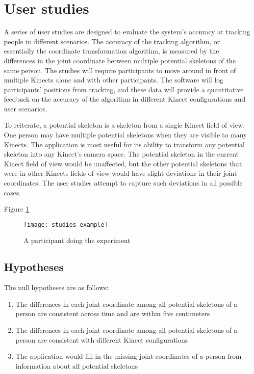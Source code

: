 \section{User studies}
\label{sec:user_studies}

A series of user studies are designed to evaluate the system's accuracy at tracking people in different scenarios. The accuracy of the tracking algorithm, or essentially the coordinate transformation algorithm, is measured by the differences in the joint coordinate between multiple potential skeletons of the same person. The studies will require participants to move around in front of multiple Kinects alone and with other participants. The software will log participants' positions from tracking, and these data will provide a quantitative feedback on the accuracy of the algorithm in different Kinect configurations and user scenarios.

To reiterate, a potential skeleton is a skeleton from a single Kinect field of view. One person may have multiple potential skeletons when they are visible to many Kinects. The application is most useful for its ability to transform any potential skeleton into any Kinect's camera space. The potential skeleton in the current Kinect field of view would be unaffected, but the other potential skeletons that were in other Kinects fields of view would have slight deviations in their joint coordinates. The user studies attempt to capture such deviations in all possible cases.

Figure \ref{fig:studies_example}

\begin{figure}[h!]
  \centering
  \texttt{[image: studies\_example]}
  \caption{A participant doing the experiment}
  \label{fig:studies_example}
\end{figure}

\subsection{Hypotheses}

The null hypotheses are as follows:

\begin{enumerate}
  \item The differences in each joint coordinate among all potential skeletons of a person are consistent across time and are within five centimeters
  \item The differences in each joint coordinate among all potential skeletons of a person are consistent with different Kinect configurations
  \item The application would fill in the missing joint coordinates of a person from information about all potential skeletons
\end{enumerate}

